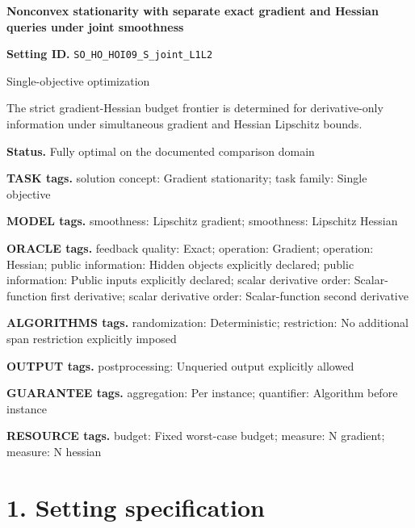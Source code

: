 \documentclass[10pt,a4paper]{article}
\begin{document}
\raggedright

{\LARGE\bfseries\sffamily\color{AtlasNavy} Nonconvex stationarity with separate exact gradient and Hessian queries under joint smoothness\par}\vspace{5pt}


\textbf{Setting ID.} \texttt{SO\_\allowbreak{}HO\_\allowbreak{}HOI09\_\allowbreak{}S\_\allowbreak{}joint\_\allowbreak{}L1L2}



Single-objective optimization



The strict gradient-Hessian budget frontier is determined for derivative-only information under simultaneous gradient and Hessian Lipschitz bounds.



\textbf{Status.} Fully optimal on the documented comparison domain



\textbf{TASK tags.} solution concept: Gradient stationarity; task family: Single objective



\textbf{MODEL tags.} smoothness: Lipschitz gradient; smoothness: Lipschitz Hessian



\textbf{ORACLE tags.} feedback quality: Exact; operation: Gradient; operation: Hessian; public information: Hidden objects explicitly declared; public information: Public inputs explicitly declared; scalar derivative order: Scalar-function first derivative; scalar derivative order: Scalar-function second derivative



\textbf{ALGORITHMS tags.} randomization: Deterministic; restriction: No additional span restriction explicitly imposed



\textbf{OUTPUT tags.} postprocessing: Unqueried output explicitly allowed



\textbf{GUARANTEE tags.} aggregation: Per instance; quantifier: Algorithm before instance



\textbf{RESOURCE tags.} budget: Fixed worst-case budget; measure: N gradient; measure: N hessian



\section{1. Setting specification}
\end{document}
